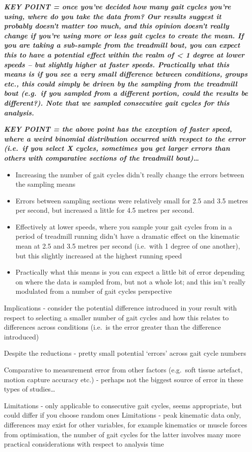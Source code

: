 \documentclass[]{elsarticle} %
\providecommand{\tightlist}{%
  \setlength{\itemsep}{0pt}\setlength{\parskip}{0pt}}
\begin{document}
\textbf{\emph{KEY POINT = once you've decided how many gait cycles
you're using, where do you take the data from? Our results suggest it
probably doesn't matter too much, and this opinion doesn't really change
if you're using more or less gait cycles to create the mean. If you are
taking a sub-sample from the treadmill bout, you can expect this to have
a potential effect within the realm of \textless{} 1 degree at lower
speeds -- but slightly higher at faster speeds. Practically what this
means is if you see a very small difference between conditions, groups
etc., this could simply be driven by the sampling from the treadmill
bout (e.g.~if you sampled from a different portion, could the results be
different?). Note that we sampled consecutive gait cycles for this
analysis.}}

\textbf{\emph{KEY POINT = the above point has the exception of faster
speed, where a weird binomial distribution occurred with respect to the
error (i.e.~if you select X cycles, sometimes you get larger errors than
others with comparative sections of the treadmill bout)\ldots{}}}

\begin{itemize}
\tightlist
\item
  Increasing the number of gait cycles didn't really change the errors
  between the sampling means
\item
  Errors between sampling sections were relatively small for 2.5 and 3.5
  metres per second, but increased a little for 4.5 metres per second.
\item
  Effectively at lower speeds, where you sample your gait cycles from in
  a period of treadmill running didn't have a dramatic effect on the
  kinematic mean at 2.5 and 3.5 metres per second (i.e.~with 1 degree of
  one another), but this slightly increased at the highest running speed
\item
  Practically what this means is you can expect a little bit of error
  depending on where the data is sampled from, but not a whole lot; and
  this isn't really modulated from a number of gait cycles perspective
\end{itemize}

Implications - consider the potential difference introduced in your
result with respect to selecting a smaller number of gait cycles and how
this relates to differences across conditions (i.e.~is the error greater
than the difference introduced)

Despite the reductions - pretty small potential `errors' across gait
cycle numbers

Comparative to measurement error from other factors (e.g.~soft tissue
artefact, motion capture accuracy etc.) - perhaps not the biggest source
of error in these types of studies\ldots{}

Limitations - only applicable to consecutive gait cycles, seems
appropriate, but could differ if you choose random ones Limitations -
peak kinematic data only, differences may exist for other variables, for
example kinematics or muscle forces from optimisation, the number of
gait cycles for the latter involves many more practical considerations
with respect to analysis time
\end{document}
